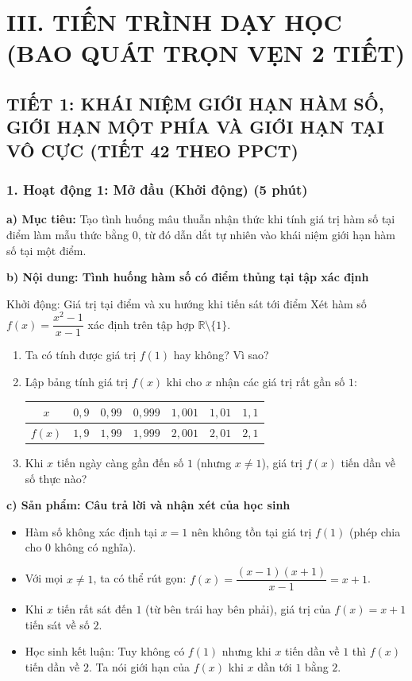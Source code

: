 \documentclass[12pt, a4paper]{article}
\begin{document}
\section*{III. TIẾN TRÌNH DẠY HỌC (BAO QUÁT TRỌN VẸN 2 TIẾT)}

\subsection*{TIẾT 1: KHÁI NIỆM GIỚI HẠN HÀM SỐ, GIỚI HẠN MỘT PHÍA VÀ GIỚI HẠN TẠI VÔ CỰC (TIẾT 42 THEO PPCT)}

\subsubsection*{1. Hoạt động 1: Mở đầu (Khởi động) (5 phút)}

\noindent \textbf{a) Mục tiêu:}
Tạo tình huống mâu thuẫn nhận thức khi tính giá trị hàm số tại điểm làm mẫu thức bằng 0, từ đó dẫn dắt tự nhiên vào khái niệm giới hạn hàm số tại một điểm.

\noindent \textbf{b) Nội dung: Tình huống hàm số có điểm thủng tại tập xác định}
\begin{pedabox}{Khởi động: Giá trị tại điểm và xu hướng khi tiến sát tới điểm}
Xét hàm số $f(x) = \dfrac{x^2 - 1}{x - 1}$ xác định trên tập hợp $\mathbb{R} \setminus \{1\}$.
\begin{enumerate}[leftmargin=0.6cm]
    \item Ta có tính được giá trị $f(1)$ hay không? Vì sao?
    \item Lập bảng tính giá trị $f(x)$ khi cho $x$ nhận các giá trị rất gần số $1$:
    \begin{center}
    \small
    \begin{tabular}{|c|c|c|c|c|c|c|}
    \hline
    $x$ & $0{,}9$ & $0{,}99$ & $0{,}999$ & $1{,}001$ & $1{,}01$ & $1{,}1$ \\ \hline
    $f(x)$ & $1{,}9$ & $1{,}99$ & $1{,}999$ & $2{,}001$ & $2{,}01$ & $2{,}1$ \\ \hline
    \end{tabular}
    \end{center}
    \item Khi $x$ tiến ngày càng gần đến số $1$ (nhưng $x \neq 1$), giá trị $f(x)$ tiến dần về số thực nào?
\end{enumerate}
\end{pedabox}

\noindent \textbf{c) Sản phẩm: Câu trả lời và nhận xét của học sinh}
\begin{itemize}[leftmargin=0.6cm]
    \item Hàm số không xác định tại $x = 1$ nên không tồn tại giá trị $f(1)$ (phép chia cho 0 không có nghĩa).
    \item Với mọi $x \neq 1$, ta có thể rút gọn: $f(x) = \dfrac{(x-1)(x+1)}{x-1} = x + 1$.
    \item Khi $x$ tiến rất sát đến $1$ (từ bên trái hay bên phải), giá trị của $f(x) = x + 1$ tiến sát về số $2$.
    \item Học sinh kết luận: Tuy không có $f(1)$ nhưng khi $x$ tiến dần về $1$ thì $f(x)$ tiến dần về $2$. Ta nói giới hạn của $f(x)$ khi $x$ dần tới $1$ bằng $2$.
\end{itemize}
\end{document}
